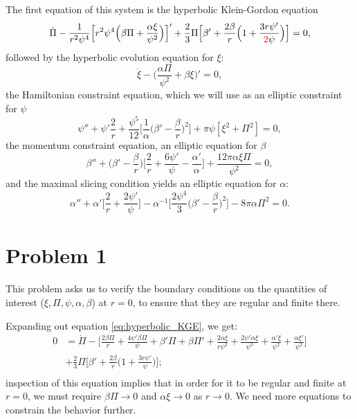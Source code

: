 \documentclass[12pt]{article}
\numberwithin{equation}{section}
\newcommand{\redtext}[1]{\textcolor{red}{#1}}
\begin{document}
The first equation of this system is the hyperbolic Klein-Gordon equation
\begin{equation} \label{eq:hyperbolic_KGE}
\dot{\Pi} - \frac{1}{r^2 \psi^4} \Big[ r^2 \psi^4 \Big( \beta \Pi + \frac{\alpha \xi}{\psi^2} \Big)\Big]' + \frac{2}{3} \Pi \Big[ \beta' + \frac{2 \beta}{r} \Big(1 + \frac{3 r \psi'}{\redtext{2} \psi} \Big) \Big] = 0,
\end{equation}
followed by the hyperbolic evolution equation for $\xi$:
\begin{equation} \label{eq:xi_evol}
\dot{\xi} - \Big( \frac{\alpha \Pi}{\psi^2} + \beta \xi \Big)' = 0,
\end{equation}
the Hamiltonian constraint equation, which we will use as an elliptic constraint for $\psi$
\begin{equation} \label{eq:psi_evol}
\psi'' + \psi' \frac{2}{r} + \frac{\psi^5}{12} \Big[ \frac{1}{\alpha} \Big( \beta' - \frac{\beta}{r} \Big)^2 \Big] + \pi \psi [\xi^2 + \Pi^2] = 0,
\end{equation}
the momentum constraint equation, an elliptic equation for $\beta$
\begin{equation} \label{eq:beta_evol}
\beta'' + \Big( \beta' - \frac{\beta}{r} \Big) \Big[ \frac{2}{r} + \frac{6 \psi'}{\psi} - \frac{\alpha'}{\alpha} \Big] + \frac{12 \pi \alpha \xi \Pi}{\psi^2} = 0,
\end{equation}
and the maximal slicing condition yields an elliptic equation for $\alpha$:
\begin{equation} \label{eq:alpha_evol}
\alpha'' + \alpha' \Big[ \frac{2}{r} + \frac{2 \psi'}{\psi} \Big] - \alpha^{-1} \Big[ \frac{2 \psi^4}{3} \Big( \beta' - \frac{\beta}{r} \Big)^2 \Big] - 8 \pi \alpha \Pi^2 = 0.
\end{equation}

\section{Problem 1}
This problem asks us to verify the boundary conditions on the quantities of interest ($\xi, \Pi, \psi, \alpha, \beta$) at $r = 0$, to ensure that they are regular and finite there.

Expanding out equation \ref{eq:hyperbolic_KGE}, we get:
\begin{equation}
\begin{aligned}
0 &= \dot{\Pi} - \Big[ \frac{2 \beta \Pi}{r} + \frac{4 \psi' \beta \Pi}{\psi} + \beta' \Pi + \beta \Pi' + \frac{2 \alpha \xi}{r \psi^2} + \frac{2 \psi' \alpha \xi}{\psi^3} + \frac{\alpha' \xi}{\psi^2} + \frac{\alpha \xi'}{\psi^2} \Big] \\
&+ \frac{2}{3} \Pi \Big[ \beta' + \frac{2 \beta}{r} \Big(1 + \frac{3 r \psi'}{\psi} \Big) \Big]; \\
\end{aligned}
\end{equation}
inspection of this equation implies that in order for it to be regular and finite at $r = 0$, we must require $\beta \Pi \to 0$ and $\alpha \xi \to 0$ as $r \to 0$.  We need more equations to constrain the behavior further.
\end{document}
